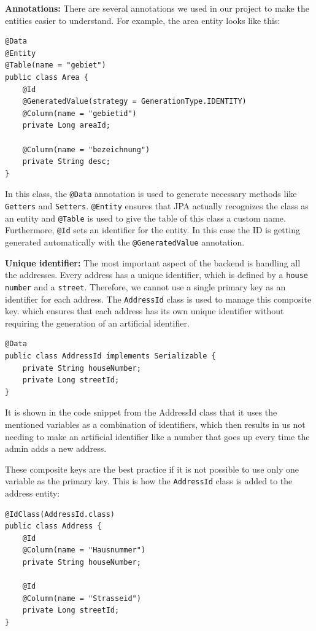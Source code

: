     \textbf{Annotations:} \newline
    There are several annotations we used in our project to make the entities easier to understand. For example, the area entity looks like this:  
    \begin{verbatim}
@Data
@Entity
@Table(name = "gebiet")
public class Area {
    @Id
    @GeneratedValue(strategy = GenerationType.IDENTITY)
    @Column(name = "gebietid")
    private Long areaId;
        
    @Column(name = "bezeichnung")
    private String desc;
}                  
    \end{verbatim} 

    In this class, the \texttt{@Data} annotation is used to generate necessary methods like \texttt{Getters} and \texttt{Setters}. \texttt{@Entity} ensures that JPA actually recognizes the class as an entity and \texttt{@Table} is used to give the table of this class a custom name. Furthermore, \texttt{@Id} sets an identifier for the entity. In this case the ID is getting generated automatically with the \texttt{@GeneratedValue} annotation.
    
    \pagebreak
    
    \textbf{Unique identifier:} \newline
    The most important aspect of the backend is handling all the addresses. Every address has a unique identifier, which is defined by a \texttt{house number} and a \texttt{street}. Therefore, we cannot use a single primary key as an identifier for each address. \newline
    The \texttt{AddressId} class is used to manage this composite key. which ensures that each address has its own unique identifier without requiring the generation of an artificial identifier.
    \begin{verbatim}
@Data
public class AddressId implements Serializable { 
    private String houseNumber;
    private Long streetId;
}                         
    \end{verbatim} 

    It is shown in the code snippet from the AddressId class that it uses the mentioned variables as a combination of identifiers, which then results in us not needing to make an artificial identifier like a number that goes up every time the admin adds a new address. \newline

    These composite keys are the best practice if it is not possible to use only one variable as the primary key. This is how the \texttt{AddressId} class is added to the address entity: 
    \begin{verbatim}
@IdClass(AddressId.class)
public class Address {
    @Id
    @Column(name = "Hausnummer")
    private String houseNumber;

    @Id
    @Column(name = "Strasseid")
    private Long streetId;
}                         
    \end{verbatim} 

